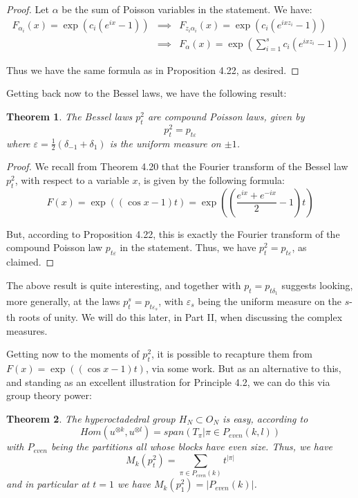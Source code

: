 \documentclass[12pt]{amsbook}
\newtheorem{theorem}{Theorem}[chapter]
\begin{document}
\begin{proof}
Let $\alpha$ be the sum of Poisson variables in the statement. We have:
\begin{eqnarray*}
F_{\alpha_i}(x)=\exp(c_i(e^{ix}-1))
&\implies&F_{z_i\alpha_i}(x)=\exp(c_i(e^{ixz_i}-1))\\
&\implies&F_\alpha(x)=\exp\left(\sum_{i=1}^sc_i(e^{ixz_i}-1)\right)
\end{eqnarray*}

Thus we have the same formula as in Proposition 4.22, as desired.
\end{proof}

Getting back now to the Bessel laws, we have the following result:


\begin{theorem}
The Bessel laws $p^2_t$ are compound Poisson laws, given by
$$p^2_t=p_{t\varepsilon}$$
where $\varepsilon=\frac{1}{2}(\delta_{-1}+\delta_1)$ is the uniform measure on $\pm1$.
\end{theorem}

\begin{proof}
We recall from Theorem 4.20 that the Fourier transform of the Bessel law $p^2_t$, with respect to a variable $x$, is given by the following formula:
$$F(x)=\exp((\cos x-1)t)=\exp\left(\left(\frac{e^{ix}+e^{-ix}}{2}-1\right)t\right)$$

But, according to Proposition 4.22, this is exactly the Fourier transform of the compound Poisson law $p_{t\varepsilon}$ in the statement. Thus, we have $p^2_t=p_{t\varepsilon}$, as claimed.
\end{proof}

The above result is quite interesting, and together with $p_t=p_{t\delta_1}$ suggests looking, more generally, at the laws $p^s_t=p_{t\varepsilon_s}$, with $\varepsilon_s$ being the uniform measure on the $s$-th roots of unity. We will do this later, in Part II, when discussing the complex measures.

\bigskip

Getting now to the moments of $p^2_t$, it is possible to recapture them from $F(x)=\exp((\cos x-1)t)$, via some work. But as an alternative to this, and standing as an excellent illustration for Principle 4.2, we can do this via group theory power:

\begin{theorem}
The hyperoctadedral group $H_N\subset O_N$ is easy, according to
$$Hom(u^{\otimes k},u^{\otimes l})=span\left(T_\pi\Big|\pi\in P_{even}(k,l)\right)$$
with $P_{even}$ being the partitions all whose blocks have even size. Thus, we have
$$M_k(p^2_t)=\sum_{\pi\in P_{even}(k)}t^{|\pi|}$$
and in particular at $t=1$ we have $M_k(p^2_1)=|P_{even}(k)|$.
\end{theorem}
\end{document}
